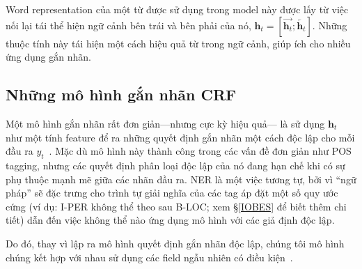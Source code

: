\documentclass[11pt,letterpaper]{article}
\begin{document}
Word representation của một từ được sử dụng trong model này được lấy từ việc nối lại tái thể hiện ngữ cảnh bên trái và bên phải của nó, $\mathbf{h}_{t} = [\overrightarrow{\mathbf{h}_{t}} ; \overleftarrow{\mathbf{h}_{t}}]$. Những thuộc tính này tái hiện một cách hiệu quả từ trong ngữ cảnh, giúp ích cho nhiều ứng dụng gắn nhãn.

\subsection{Những mô hình gắn nhãn CRF}
\label{sec:crf}
Một mô hình gắn nhãn rất đơn giản---nhưng cực kỳ hiệu quả--- là sử dụng $\mathbf{h}_t$ như một tính feature để ra những quyết định gắn nhãn một cách độc lập cho mỗi đầu ra $y_t$~\cite{ling:2015}. 
Mặc dù mô hình này thành công trong các vấn đề đơn giản như POS tagging, nhưng các quyết định phân loại độc lập của nó đang hạn chế khi có sự phụ thuộc mạnh mẽ giữa các nhãn đầu ra. 
NER là một việc tương tự, bởi vì ``ngữ pháp'' sẽ đặc trưng cho trình tự giải nghĩa của các tag áp đặt một số quy ước cứng  (ví dụ: I-PER không thể theo sau B-LOC; xem \S\ref{IOBES} để biết thêm chi tiết) dẫn đến việc không thể nào ứng dụng mô hình với các giả định độc lập.

Do đó, thay vì lập ra mô hình quyết định gắn nhãn độc lập, chúng tôi mô hình chúng kết hợp với nhau sử dụng các field ngẫu nhiên có điều kiện~\cite{lafferty2001conditional}.
\end{document}
